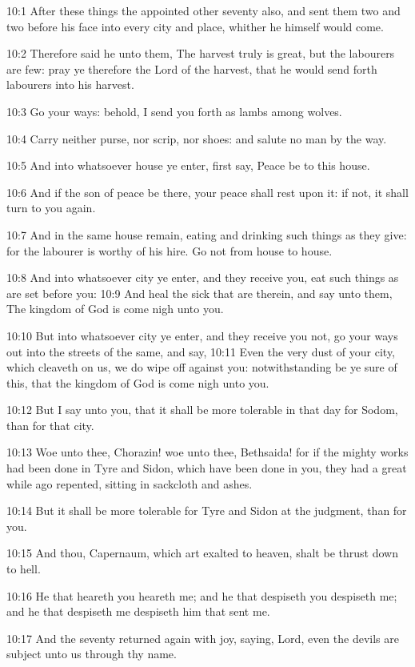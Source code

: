 10:1 After these things the \LORD appointed other seventy also, and
sent them two and two before his face into every city and place,
whither he himself would come.

10:2 Therefore said he unto them, The harvest truly is great, but the
labourers are few: pray ye therefore the Lord of the harvest, that he
would send forth labourers into his harvest.

10:3 Go your ways: behold, I send you forth as lambs among wolves.

10:4 Carry neither purse, nor scrip, nor shoes: and salute no man by
the way.

10:5 And into whatsoever house ye enter, first say, Peace be to this
house.

10:6 And if the son of peace be there, your peace shall rest upon it:
if not, it shall turn to you again.

10:7 And in the same house remain, eating and drinking such things as
they give: for the labourer is worthy of his hire. Go not from house
to house.

10:8 And into whatsoever city ye enter, and they receive you, eat such
things as are set before you: 10:9 And heal the sick that are therein,
and say unto them, The kingdom of God is come nigh unto you.

10:10 But into whatsoever city ye enter, and they receive you not, go
your ways out into the streets of the same, and say, 10:11 Even the
very dust of your city, which cleaveth on us, we do wipe off against
you: notwithstanding be ye sure of this, that the kingdom of God is
come nigh unto you.

10:12 But I say unto you, that it shall be more tolerable in that day
for Sodom, than for that city.

10:13 Woe unto thee, Chorazin! woe unto thee, Bethsaida! for if the
mighty works had been done in Tyre and Sidon, which have been done in
you, they had a great while ago repented, sitting in sackcloth and
ashes.

10:14 But it shall be more tolerable for Tyre and Sidon at the
judgment, than for you.

10:15 And thou, Capernaum, which art exalted to heaven, shalt be
thrust down to hell.

10:16 He that heareth you heareth me; and he that despiseth you
despiseth me; and he that despiseth me despiseth him that sent me.

10:17 And the seventy returned again with joy, saying, Lord, even the
devils are subject unto us through thy name.

